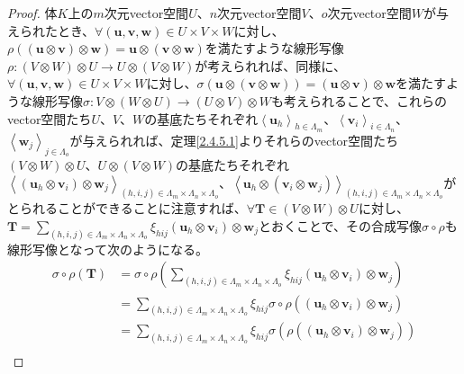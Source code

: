 \documentclass[dvipdfmx]{jsarticle}
\begin{document}
\begin{proof}
体$K$上の$m$次元vector空間$U$、$n$次元vector空間$V$、$o$次元vector空間$W$が与えられたとき、$\forall\left( \mathbf{u},\mathbf{v},\mathbf{w} \right) \in U \times V \times W$に対し、$\rho\left( \left( \mathbf{u} \otimes \mathbf{v} \right) \otimes \mathbf{w} \right) = \mathbf{u} \otimes \left( \mathbf{v} \otimes \mathbf{w} \right)$を満たすような線形写像$\rho:(V \otimes W) \otimes U \rightarrow U \otimes (V \otimes W)$が考えられれば、同様に、$\forall\left( \mathbf{u},\mathbf{v},\mathbf{w} \right) \in U \times V \times W$に対し、$\sigma\left( \mathbf{u} \otimes \left( \mathbf{v} \otimes \mathbf{w} \right) \right) = \left( \mathbf{u} \otimes \mathbf{v} \right) \otimes \mathbf{w}$を満たすような線形写像$\sigma:V \otimes (W \otimes U) \rightarrow (U \otimes V) \otimes W$も考えられることで、これらのvector空間たち$U$、$V$、$W$の基底たちそれぞれ$\left\langle \mathbf{u}_{h} \right\rangle_{h \in \varLambda_{m}}$、$\left\langle \mathbf{v}_{i} \right\rangle_{i \in \varLambda_{n}}$、$\left\langle \mathbf{w}_{j} \right\rangle_{j \in \varLambda_{o}}$が与えられれば、定理\ref{2.4.5.1}よりそれらのvector空間たち$(V \otimes W) \otimes U$、$U \otimes (V \otimes W)$の基底たちそれぞれ$\left\langle \left( \mathbf{u}_{h} \otimes \mathbf{v}_{i} \right) \otimes \mathbf{w}_{j} \right\rangle_{(h,i,j) \in \varLambda_{m} \times \varLambda_{n} \times \varLambda_{o}}$、$\left\langle \mathbf{u}_{h} \otimes \left( \mathbf{v}_{i} \otimes \mathbf{w}_{j} \right) \right\rangle_{(h,i,j) \in \varLambda_{m} \times \varLambda_{n} \times \varLambda_{o}}$がとられることができることに注意すれば、$\forall\mathbf{T} \in (V \otimes W) \otimes U$に対し、$\mathbf{T} = \sum_{(h,i,j) \in \varLambda_{m} \times \varLambda_{n} \times \varLambda_{o}} {\xi_{hij}\left( \mathbf{u}_{h} \otimes \mathbf{v}_{i} \right) \otimes \mathbf{w}_{j}}$とおくことで、その合成写像$\sigma \circ \rho$も線形写像となって次のようになる。
\begin{align*}
\sigma \circ \rho\left( \mathbf{T} \right) &= \sigma \circ \rho\left( \sum_{(h,i,j) \in \varLambda_{m} \times \varLambda_{n} \times \varLambda_{o}} {\xi_{hij}\left( \mathbf{u}_{h} \otimes \mathbf{v}_{i} \right) \otimes \mathbf{w}_{j}} \right)\\
&= \sum_{(h,i,j) \in \varLambda_{m} \times \varLambda_{n} \times \varLambda_{o}} {\xi_{hij}\sigma \circ \rho\left( \left( \mathbf{u}_{h} \otimes \mathbf{v}_{i} \right) \otimes \mathbf{w}_{j} \right)}\\
&= \sum_{(h,i,j) \in \varLambda_{m} \times \varLambda_{n} \times \varLambda_{o}} {\xi_{hij}\sigma\left( \rho\left( \left( \mathbf{u}_{h} \otimes \mathbf{v}_{i} \right) \otimes \mathbf{w}_{j} \right) \right)}\\

\end{align*}
\end{proof}
\end{document}
